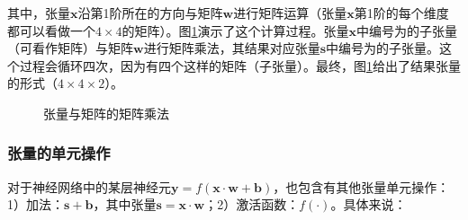 \noindent 其中，张量$ \mathbf x $沿第1阶所在的方向与矩阵$ \mathbf w $进行矩阵运算（张量$ \mathbf x $第1阶的每个维度都可以看做一个$ 4\times 4 $的矩阵）。图\ref{fig:5-27}演示了这个计算过程。张量$ \mathbf x $中编号为的子张量（可看作矩阵）与矩阵$ \mathbf w $进行矩阵乘法，其结果对应张量$ \mathbf s $中编号为的子张量。这个过程会循环四次，因为有四个这样的矩阵（子张量）。最终，图\ref{fig:5-27}给出了结果张量的形式（$ 4 \times 4 \times 2 $）。

\begin{figure}[htp]
\centering

\caption{张量与矩阵的矩阵乘法}
\label{fig:5-27}
\end {figure}


\subsubsection{张量的单元操作}
\vspace{0.5em}

\parinterval 对于神经网络中的某层神经元$ \mathbf y=f(\mathbf x\cdot \mathbf w+\mathbf b) $，也包含有其他张量单元操作：1）加法：$ \mathbf s+\mathbf b $，其中张量$ \mathbf s=\mathbf x\cdot \mathbf w $；2）激活函数：$ f(\cdot) $。具体来说：

